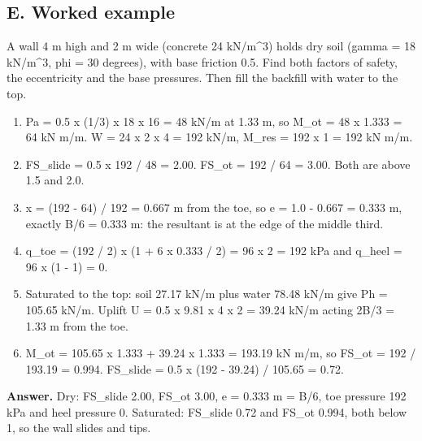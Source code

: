 \documentclass[11pt,a4paper]{article}
\begin{document}
\subsection*{E. Worked example}
A wall 4 m high and 2 m wide (concrete 24 kN/m\textasciicircum{}3) holds dry soil (gamma = 18 kN/m\textasciicircum{}3, phi = 30 degrees), with base friction 0.5. Find both factors of safety, the eccentricity and the base pressures. Then fill the backfill with water to the top.
\begin{enumerate}[nosep]
\item Pa = 0.5 x (1/3) x 18 x 16 = 48 kN/m at 1.33 m, so M\_ot = 48 x 1.333 = 64 kN m/m. W = 24 x 2 x 4 = 192 kN/m, M\_res = 192 x 1 = 192 kN m/m.
\item FS\_slide = 0.5 x 192 / 48 = 2.00. FS\_ot = 192 / 64 = 3.00. Both are above 1.5 and 2.0.
\item x = (192 - 64) / 192 = 0.667 m from the toe, so e = 1.0 - 0.667 = 0.333 m, exactly B/6 = 0.333 m: the resultant is at the edge of the middle third.
\item q\_toe = (192 / 2) x (1 + 6 x 0.333 / 2) = 96 x 2 = 192 kPa and q\_heel = 96 x (1 - 1) = 0.
\item Saturated to the top: soil 27.17 kN/m plus water 78.48 kN/m give Ph = 105.65 kN/m. Uplift U = 0.5 x 9.81 x 4 x 2 = 39.24 kN/m acting 2B/3 = 1.33 m from the toe.
\item M\_ot = 105.65 x 1.333 + 39.24 x 1.333 = 193.19 kN m/m, so FS\_ot = 192 / 193.19 = 0.994. FS\_slide = 0.5 x (192 - 39.24) / 105.65 = 0.72.
\end{enumerate}
\textbf{Answer.} Dry: FS\_slide 2.00, FS\_ot 3.00, e = 0.333 m = B/6, toe pressure 192 kPa and heel pressure 0. Saturated: FS\_slide 0.72 and FS\_ot 0.994, both below 1, so the wall slides and tips.
\end{document}

